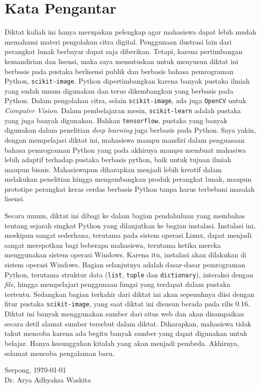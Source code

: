 \chapter*{Kata Pengantar}
Diktat kuliah ini hanya merupakan pelengkap agar mahasiswa dapat lebih mudah memahami materi pengolahan citra digital. Penggunaan ilustrasi lain dari perangkat lunak berbayar dapat saja diberikan. Tetapi, karena pertimbangan kemandirian dan lisensi, maka saya memutuskan untuk menyusun diktat ini berbasis pada pustaka berlisensi publik dan berbasis bahasa pemrograman Python, \texttt{scikit-image}. Python dipertimbangkan karena banyak pustaka ilmiah yang sudah umum digunakan dan terus dikembangkan yang berbasis pada Python. Dalam pengolahan citra, selain \texttt{scikit-image}, ada juga \texttt{OpenCV} untuk \textit{Computer Vision}. Dalam pembelajaran mesin, \texttt{scikit-learn} adalah pustaka yang juga banyak digunakan. Bahkan \texttt{tensorflow}, pustaka yang banyak digunakan dalam penelitian \textit{deep learning} juga berbasis pada Python. Saya yakin, dengan mempelajari diktat ini, mahasiswa mampu mandiri dalam penguasaan bahasa pemrograman Python yang pada akhirnya mampu membuat mahasiwa lebih adaptif terhadap pustaka berbasis python, baik untuk tujuan ilmiah maupun bisnis. Mahasiswapun diharapkan menjadi lebih kreatif dalam melakukan penelitian hingga mengembangkan produk perangkat lunak, maupun prototipe perangkat keras cerdas berbasis Python tanpa harus terbebani masalah lisensi.

Secara umum, diktat ini dibagi ke dalam bagian pendahuluan yang membahas tentang sejarah singkat Python yang dilanjutkan ke bagian instalasi. Instalasi ini, meskipun sangat sederhana, terutama pada sistem operasi Linux, dapat menjadi sangat merepotkan bagi beberapa mahasiswa, terutama ketika mereka menggunakan sistem operasi Windows. Karena itu, instalasi akan dilakukan di sistem operasi Windows. Bagian selanjutnya adalah dasar-dasar pemrograman Python, terutama struktur data (\texttt{list}, \texttt{tuple} dan \texttt{dictionary}), interaksi dengan \textit{file}, hingga mempelajari penggunaan fungsi yang terdapat dalam pustaka tertentu. Sedangkan bagian terkahir dari diktat ini akan sepenuhnya diisi dengan fitur pustaka \texttt{scikit-image}, yang saat diktat ini disusun berada pada rilis 0.16.
\clearpage
Diktat ini banyak menggunakan sumber dari situs web dan akan disampaikan secara detil alamat sumber tersebut dalam diktat. Diharapkan, mahasiswa tidak takut mencoba karena ada begitu banyak sumber yang dapat digunakan untuk belajar. Hanya kesungguhan kitalah yang akan menjadi pembeda. Akhirnya, selamat mencoba pengalaman baru. 

\vspace*{2cm}
\begin{flushright}
Serpong, \today\\[0.1cm]
\vspace*{1cm}
Dr. Arya Adhyaksa Waskita

\end{flushright}
